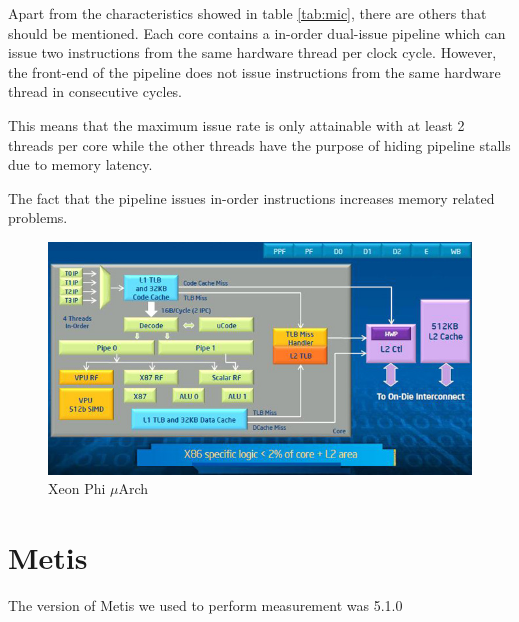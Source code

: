 \documentclass[abstract=on,9pt,twocolumn]{scrartcl}
\begin{document}

Apart from the characteristics showed in table \ref{tab:mic}, there are
others that should be mentioned. Each core contains a in-order dual-issue pipeline which can issue two instructions from the same hardware thread
per clock cycle. However, the front-end of the pipeline does not issue
instructions from the same hardware thread in consecutive cycles.\cite{Cepeda:PhiPerformance}

This means that the maximum issue rate is only attainable with at least
2 threads per core while the other threads have the purpose of hiding
pipeline stalls due to memory latency.

The fact that the pipeline issues in-order instructions increases
memory related problems. %

\begin{center}
\begin{figure}[htb]
    \includegraphics[width=\columnwidth]{img/phi_arch.jpg}
    \caption{Xeon Phi $\mu$Arch}
    \label{img:phi_arch}
\end{figure}
\end{center}



\section{Metis}
\label{sec:metis}


The version of Metis we used to perform measurement was 5.1.0
\end{document}
